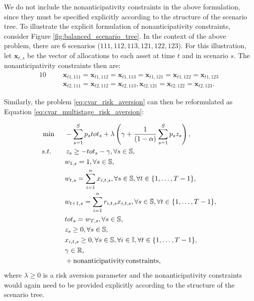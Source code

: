 \begin{rem}
We do not include the nonanticipativity constraints in the above formulation, since they must be specified explicitly according to the structure of the scenario tree. To illustrate the explicit formulation of nonanticipativity constraints, consider Figure \ref{fig:balanced_scenario_tree}. In the context of the above problem, there are 6 scenarios ($111, 112, 113, 121, 122, 123$). For this illustration, let $\mathbf{x}_{t,s}$ be the vector of allocations to each asset at time $t$ and in scenario $s$. The nonanticipativity constraints then are:
\begin{alignat}{10}
& && \mathbf{x}_{t1,111}=\mathbf{x}_{t1,112}=\mathbf{x}_{t1,113}=\mathbf{x}_{t1,121}=\mathbf{x}_{t1,122}=\mathbf{x}_{t1,123} \nonumber \\
& && \mathbf{x}_{t2,111}=\mathbf{x}_{t2,112}=\mathbf{x}_{t2,113},\mathbf{x}_{t2,121}=\mathbf{x}_{t2,122}=\mathbf{x}_{t2,123}. \nonumber
\end{alignat}
\end{rem}
Similarly, the problem \ref{eq:cvar_risk_aversion} can then be reformulated as Equation \ref{eq:cvar_multistage_risk_aversion}:

\begin{alignat}{10}
& \min  \, \, \, && - \sum_{s=1}^{S} p_s tot_s + \lambda \left( \gamma + \frac{1}{(1-\alpha)} \sum_{s=1}^S p_s z_s \right), \label{eq:cvar_multistage_risk_aversion}  \\
&s.t. && \, z_s \geq  -tot_s -\gamma, \forall s \in \mathbb{S}, \nonumber \\
& && w_{1,s}=1, \forall s \in \mathbb{S}, \nonumber \\
& && w_{t,s}=\sum_{i=1}^{n} x_{i,t,s}, \forall s \in \mathbb{S}, \forall t \in \{1,\dots ,T-1\}, \nonumber \\
& && w_{t+1,s}=\sum_{i=1}^{n} r_{i,t,s} x_{i,t,s}, \forall s \in \mathbb{S}, \forall t \in \{1,\dots ,T-1\},  \nonumber \\
& && tot_s = w_{T,s}, \forall s \in \mathbb{S}, \nonumber \\
& && z_s \geq 0, \forall s \in \mathbb{S}, \nonumber \\
& && x_{i,t,s} \geq 0, \forall s \in \mathbb{S}, \forall i \in \mathbb{I}, \forall t \in \{1,\dots ,T-1\}, \nonumber \\
& && \gamma \in \R ,\nonumber \\
& && + \mathrm{nonanticipativity \, constraints}, \nonumber
\end{alignat}
where $\lambda \geq 0$ is a risk aversion parameter and the nonanticipativity constraints would again need to be provided explicitly according to the structure of the scenario tree.